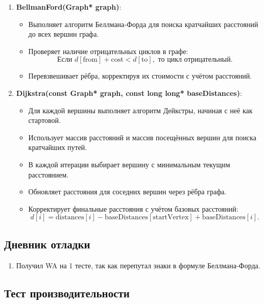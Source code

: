 \documentclass[12pt]{article}
\begin{document}
\begin{enumerate}
    \item \textbf{BellmanFord(Graph* graph)}:
    \begin{itemize}
        \item Выполняет алгоритм Беллмана-Форда для поиска кратчайших расстояний до всех вершин графа.
        \item Проверяет наличие отрицательных циклов в графе:
        \[
        \text{Если } d[\text{from}] + \text{cost} < d[\text{to}], \text{ то цикл отрицательный.}
        \]
        \item Перевзвешивает рёбра, корректируя их стоимости с учётом расстояний.

    \end{itemize}
    
    \item \textbf{Dijkstra(const Graph* graph, const long long* baseDistances)}:
    \begin{itemize}
        \item Для каждой вершины выполняет алгоритм Дейкстры, начиная с неё как стартовой.
        \item Использует массив расстояний и массив посещённых вершин для поиска кратчайших путей.
        \item В каждой итерации выбирает вершину с минимальным текущим расстоянием.
        \item Обновляет расстояния для соседних вершин через рёбра графа.
        \item Корректирует финальные расстояния с учётом базовых расстояний:
        \[
        d[i] = \text{distances}[i] - \text{baseDistances}[\text{startVertex}] + \text{baseDistances}[i].
        \]
    \end{itemize}
\end{enumerate}


\newpage
\subsection*{Дневник отладки}

\begin{enumerate}
    \item Получил WA на 1 тесте, так как перепутал знаки в формуле Беллмана-Форда.
\end{enumerate}

\newpage
\subsection*{Тест производительности}
\end{document}
